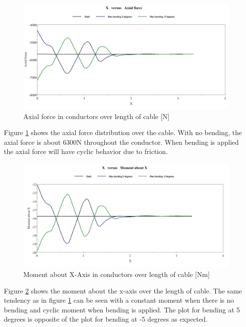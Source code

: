 \begin{figure}[H]
\centering
\includegraphics[scale=0.75]{figures/bflexax}
\caption[$\; \:$Axial force in conductors]{Axial force in conductors over length of cable [N]}
 \label{fig:bflexax}
\end{figure}
\noindent Figure \ref{fig:bflexax} shows the axial force distribution over the cable. With no bending, the axial force is about 6300N throughout the conductor. When bending is applied the axial force will have cyclic behavior due to friction.
\begin{figure}[H]
\centering
\includegraphics[scale=0.75]{figures/bflexmx}
\caption[$\; \:$Moment about X-Axis in conductors]{Moment about X-Axis in conductors over length of cable  [Nm]}
 \label{fig:bflexmx}
\end{figure}

\noindent Figure \ref{fig:bflexmx} shows the moment about the x-axis over the length of cable. The same tendency as in figure \ref{fig:bflexax} can be seen with a constant moment when there is no bending and cyclic moment when bending is applied. The plot for bending at 5 degrees is opposite of the plot for bending at -5 degrees as expected.  


